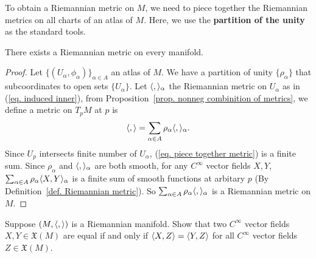 To obtain a Riemannian metric on $M$, we need to piece together the Riemannian 
metrics on all charts of an atlas of $M$. Here, we use the 
\textbf{partition of the unity} as the standard tools.
\begin{theorem}
    There exists a Riemannian metric on every manifold.
\end{theorem}
\begin{proof}
    Let $\{(U_\alpha, \phi_\alpha)\}_{\alpha \in A}$ an atlas of $M$. 
    We have a partition of unity $\{\rho_\alpha\}$ that subcoordinates to 
    open sets $\{U_\alpha\}$. 
    Let $\langle ,  \rangle_\alpha$ the Riemannian metric on $U_\alpha$ as in (\ref{eq. induced inner}), 
    from Proposition~\ref{prop. nonneg combinition of metrics}, we define a metric
    on $T_pM$ at $p$ is 
    \begin{align}
        \langle ,  \rangle = \sum_{\alpha\in A} \rho_\alpha \langle ,  \rangle_\alpha.
        \label{eq. piece together metric}
    \end{align}
    Since $U_p$ intersects finite number of $U_\alpha$, (\ref{eq. piece together metric}) is
    a finite sum.
    Since $\rho_\alpha$ and $\langle ,  \rangle_\alpha$ are both smooth, for any $C^\infty$
    vector fields $X, Y$,
    $\sum_{\alpha\in A} \rho_\alpha \langle X, Y \rangle_\alpha$ 
    is a finite sum of smooth functions at arbitary $p$
     (By Definition~\ref{def. Riemannian metric}). 
     So $\sum_{\alpha\in A} \rho_\alpha \langle ,  \rangle_\alpha$ is a Riemannian metric on $M$.
\end{proof}

\begin{problem}
    Suppose $(M, \langle ,  \rangle)$ is a Riemannian manifold. Show that two $C^\infty$ vector fields
    $X,Y \in \mathfrak{X}(M)$ are equal if and only if $\langle X, Z \rangle=\langle Y, Z \rangle$ for all
    $C^\infty$ vector fields $Z\in\mathfrak{X}(M)$.
\end{problem}
